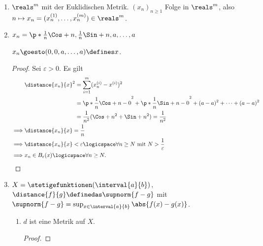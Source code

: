 \begin{beispiele}
    \begin{enumerate}
        \item \( \reals^m \) mit der Euklidischen Metrik. \( (x_n)_{n\geq 1} \) Folge in \( \reals^m \), also \( n\mapsto x_n=(x_n^{(1)},\ldots, x_n^{(m)})\in \reals^m \).
        \item \( x_n=\p*{ \frac{1}{n}\Cos+{n},\frac{1}{n}\Sin+{n},a,\ldots,a } \)
        \begin{behauptung*}
            \( x_n\goesto (0,0,a,\ldots,a)\defines x \).
        \end{behauptung*}
        \begin{proof}
            Sei \( \varepsilon>0 \). Es gilt
            \begin{align*}
                &\distance{x_n}{x}^2 \begin{aligned}[t] 
                    &=\sum\limits_{i=1}^{m} (x_n^{(i)}-x^{(i)})^2\\
                    &=\p*{ \frac{1}{n}\Cos+{n}-0 }^2+\p*{ \frac{1}{n}\Sin+{n}-0 }^2+(a-a)^2+\cdots +(a-a)^2\\
                    &=\frac{1}{n^2}(\Cos+{n}^2+\Sin+{n}^2)=\frac{1}{n^2}
                \end{aligned}\\
                \implies &\distance{x_n}{x}=\frac{1}{n}\\
                \implies &\distance{x_n}{x}<\varepsilon\logicspace\forall n\geq N\text{ mit } N>\frac{1}{\varepsilon}\\
                \implies &x_n \in B_\varepsilon(x) \logicspace\forall n \geq N.
            \end{align*}            
        \end{proof}
        
        \item \( X=\stetigefunktionen(\interval{a}{b}) \), \( \distance{f}{g}\definedas \supnorm{f-g} \) mit \( \supnorm{f-g}=\sup_{x\in \interval{a}{b}}\abs{f(x)-g(x)} \).
        \begin{enumerate}[label=\textbf{\arabic*. Beh}]
            \item \( d \) ist eine Metrik auf \( X \).
            \begin{proof}
\end{proof}
\end{enumerate}
\end{enumerate}
\end{beispiele}
